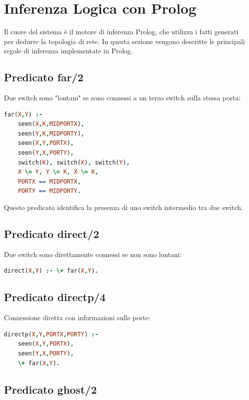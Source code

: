 \documentclass[12pt,a4paper]{article}
\begin{document}
\section{Inferenza Logica con Prolog}
\label{sec:inference}

Il cuore del sistema è il motore di inferenza Prolog, che utilizza i fatti generati per dedurre la topologia di rete.
In questa sezione vengono descritte le principali regole di inferenza implementate in Prolog.

\subsection{Predicato far/2}

Due switch sono "lontani" se sono connessi a un terzo switch sulla stessa porta:

\begin{lstlisting}[language=Prolog]
far(X,Y) :- 
    seen(X,K,MIDPORTX), 
    seen(Y,K,MIDPORTY),
    seen(X,Y,PORTX),
    seen(Y,X,PORTY),
    switch(K), switch(X), switch(Y), 
    X \= Y, Y \= K, X \= K, 
    PORTX == MIDPORTX,
    PORTY == MIDPORTY.
\end{lstlisting}

Questo predicato identifica la presenza di uno switch intermedio tra due switch.

\subsection{Predicato direct/2}

Due switch sono direttamente connessi se non sono lontani:

\begin{lstlisting}[language=Prolog]
direct(X,Y) :- \+ far(X,Y).
\end{lstlisting}

\subsection{Predicato directp/4}

Connessione diretta con informazioni sulle porte:

\begin{lstlisting}[language=Prolog]
directp(X,Y,PORTX,PORTY) :- 
    seen(X,Y,PORTX),
    seen(Y,X,PORTY),
    \+ far(X,Y).
\end{lstlisting}

\subsection{Predicato ghost/2}
\end{document}

